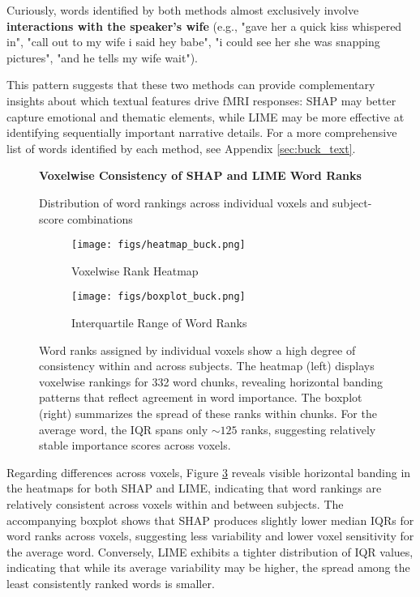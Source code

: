 \documentclass[10pt,letterpaper]{article}
\begin{document}
Curiously, words identified by both methods almost exclusively involve \textbf{interactions with the speaker's wife} (e.g., "gave her a quick kiss whispered in", "call out to my wife i said hey babe", "i could see her she was snapping pictures", "and he tells my wife wait").

This pattern suggests that these two methods can provide complementary insights about which textual features drive fMRI responses: SHAP may better capture emotional and thematic elements, while LIME may be more effective at identifying sequentially important narrative details. For a more comprehensive list of words identified by each method, see Appendix \ref{sec:buck_text}.

\begin{figure}[ht]
    \centering

    \parbox{\textwidth}{\centering 
        \fontsize{13pt}{13pt}\selectfont \textbf{Voxelwise Consistency of SHAP and LIME Word Ranks}  
        
        {\fontsize{11pt}{13pt}\selectfont Distribution of word rankings across individual voxels and subject-score combinations} 
    }
    
    \begin{subfigure}[t]{0.35\textwidth}
        \centering
        \caption{Voxelwise Rank Heatmap}
        \texttt{[image: figs/heatmap\_buck.png]}
        \label{subfig:heatmap_buck}
    \end{subfigure}
    \hfill
    \begin{subfigure}[t]{0.35\textwidth}
        \centering
        \caption{Interquartile Range of Word Ranks}
        \texttt{[image: figs/boxplot\_buck.png]}
        \label{subfig:boxplot_buck}
    \end{subfigure}
    \caption{Word ranks assigned by individual voxels show a high degree of consistency within and across subjects. The heatmap (left) displays voxelwise rankings for 332 word chunks, revealing horizontal banding patterns that reflect agreement in word importance. The boxplot (right) summarizes the spread of these ranks within chunks. For the average word, the IQR spans only ${\sim}125$ ranks, suggesting relatively stable importance scores across voxels.}
    \label{fig:buck_voxelwise}
\end{figure}

\newpage

Regarding differences across voxels, Figure \ref{fig:buck_voxelwise} reveals visible horizontal banding in the heatmaps for both SHAP and LIME, indicating that word rankings are relatively consistent across voxels within and between subjects. The accompanying boxplot shows that SHAP produces slightly lower median IQRs for word ranks across voxels, suggesting less variability and lower voxel sensitivity for the average word. Conversely, LIME exhibits a tighter distribution of IQR values, indicating that while its average variability may be higher, the spread among the least consistently ranked words is smaller.
\end{document}
